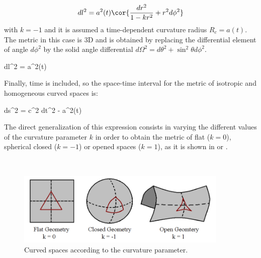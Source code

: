 \[ dl^2 = a^2(t) \cor { \frac{dr^2}{1-kr^2} + r^2 d\phi^2 } \]
with $k = -1$ and it is assumed a time-dependent curvature radius $R_c = 
a(t)$. The metric in this case is 3D and is obtained by replacing the 
differential element of angle $d\phi^2$ by the solid angle differential 
$d\Omega^2 = d\theta^2 + \sin^2\theta d\phi^2$.


 
{ dl^2 = a^2(t)  }


Finally, time is included, so the space-time interval for the metric of
isotropic and homogeneous curved spaces is:



{ ds^2 = c^2 dt^2 - a^2(t)  }


The direct generalization of this expression consists in varying the 
different values of the curvature parameter $k$ in order to obtain the 
metric of flat ($k = 0$), spherical closed ($k = -1$) or opened spaces
($k = 1$), as it is shown in \cite{longair2008} or \cite{padmanabhan1995}.


\
\begin{figure}[htbp]
	\centering
	\includegraphics[width=0.9\textwidth]
	{./figures/2_theoretical_framework/Curved_Spaces.png}

	\caption{\small{Curved spaces according to the curvature parameter.}}
	
	\label{fig:CurvedSpaces}
\end{figure}
\

